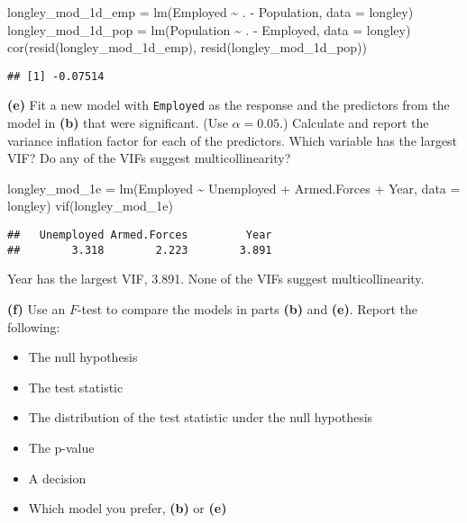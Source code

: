 \documentclass[
]{article}
\newenvironment{Shaded}{\begin{snugshade}}{\end{snugshade}}
\newcommand{\AttributeTok}[1]{\textcolor[rgb]{0.77,0.63,0.00}{#1}}
\newcommand{\FunctionTok}[1]{\textcolor[rgb]{0.00,0.00,0.00}{#1}}
\newcommand{\NormalTok}[1]{#1}
\newcommand{\OtherTok}[1]{\textcolor[rgb]{0.56,0.35,0.01}{#1}}
\newcommand{\SpecialCharTok}[1]{\textcolor[rgb]{0.00,0.00,0.00}{#1}}
\providecommand{\tightlist}{%
  \setlength{\itemsep}{0pt}\setlength{\parskip}{0pt}}
\begin{document}
\begin{Shaded}
\begin{Highlighting}[]
\NormalTok{longley\_mod\_1d\_emp }\OtherTok{=} \FunctionTok{lm}\NormalTok{(Employed }\SpecialCharTok{\textasciitilde{}}\NormalTok{ . }\SpecialCharTok{{-}}\NormalTok{ Population, }\AttributeTok{data =}\NormalTok{ longley)}
\NormalTok{longley\_mod\_1d\_pop }\OtherTok{=} \FunctionTok{lm}\NormalTok{(Population }\SpecialCharTok{\textasciitilde{}}\NormalTok{ . }\SpecialCharTok{{-}}\NormalTok{ Employed, }\AttributeTok{data =}\NormalTok{ longley)}
\FunctionTok{cor}\NormalTok{(}\FunctionTok{resid}\NormalTok{(longley\_mod\_1d\_emp), }\FunctionTok{resid}\NormalTok{(longley\_mod\_1d\_pop))}
\end{Highlighting}
\end{Shaded}

\begin{verbatim}
## [1] -0.07514
\end{verbatim}

\textbf{(e)} Fit a new model with \texttt{Employed} as the response and
the predictors from the model in \textbf{(b)} that were significant.
(Use \(\alpha = 0.05\).) Calculate and report the variance inflation
factor for each of the predictors. Which variable has the largest VIF?
Do any of the VIFs suggest multicollinearity?

\begin{Shaded}
\begin{Highlighting}[]
\NormalTok{longley\_mod\_1e }\OtherTok{=} \FunctionTok{lm}\NormalTok{(Employed }\SpecialCharTok{\textasciitilde{}}\NormalTok{ Unemployed  }\SpecialCharTok{+}\NormalTok{ Armed.Forces }\SpecialCharTok{+}\NormalTok{ Year, }\AttributeTok{data =}\NormalTok{ longley)}
\FunctionTok{vif}\NormalTok{(longley\_mod\_1e)}
\end{Highlighting}
\end{Shaded}

\begin{verbatim}
##   Unemployed Armed.Forces         Year 
##        3.318        2.223        3.891
\end{verbatim}

Year has the largest VIF, 3.891. None of the VIFs suggest
multicollinearity.

\textbf{(f)} Use an \(F\)-test to compare the models in parts
\textbf{(b)} and \textbf{(e)}. Report the following:

\begin{itemize}
\tightlist
\item
  The null hypothesis
\item
  The test statistic
\item
  The distribution of the test statistic under the null hypothesis
\item
  The p-value
\item
  A decision
\item
  Which model you prefer, \textbf{(b)} or \textbf{(e)}
\end{itemize}
\end{document}
